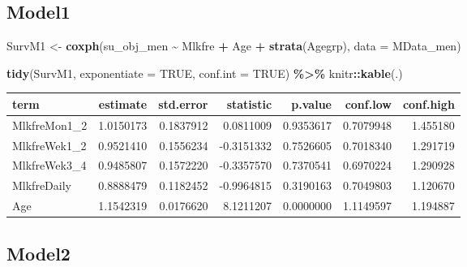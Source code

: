 \documentclass[
]{article}
\newenvironment{Shaded}{\begin{snugshade}}{\end{snugshade}}
\newcommand{\DataTypeTok}[1]{\textcolor[rgb]{0.13,0.29,0.53}{#1}}
\newcommand{\KeywordTok}[1]{\textcolor[rgb]{0.13,0.29,0.53}{\textbf{#1}}}
\newcommand{\NormalTok}[1]{#1}
\newcommand{\OperatorTok}[1]{\textcolor[rgb]{0.81,0.36,0.00}{\textbf{#1}}}
\newcommand{\OtherTok}[1]{\textcolor[rgb]{0.56,0.35,0.01}{#1}}
\newcommand{\StringTok}[1]{\textcolor[rgb]{0.31,0.60,0.02}{#1}}
\begin{document}
\hypertarget{model1-9}{%
\subsection{Model1}\label{model1-9}}

\begin{Shaded}
\begin{Highlighting}[]
\NormalTok{SurvM1 \textless{}{-}}\StringTok{  }\KeywordTok{coxph}\NormalTok{(su\_obj\_men }\OperatorTok{\textasciitilde{}}\StringTok{ }\NormalTok{Mlkfre }\OperatorTok{+}\StringTok{ }\NormalTok{Age }\OperatorTok{+}\StringTok{ }\KeywordTok{strata}\NormalTok{(Agegrp), }
                 \DataTypeTok{data =}\NormalTok{ MData\_men)}

\KeywordTok{tidy}\NormalTok{(SurvM1, }\DataTypeTok{exponentiate =} \OtherTok{TRUE}\NormalTok{, }\DataTypeTok{conf.int =} \OtherTok{TRUE}\NormalTok{) }\OperatorTok{\%\textgreater{}\%}\StringTok{ }
\StringTok{  }\NormalTok{knitr}\OperatorTok{::}\KeywordTok{kable}\NormalTok{(.)}
\end{Highlighting}
\end{Shaded}

\begin{longtable}[]{@{}lrrrrrr@{}}
\toprule
term & estimate & std.error & statistic & p.value & conf.low &
conf.high\tabularnewline
\midrule
\endhead
MlkfreMon1\_2 & 1.0150173 & 0.1837912 & 0.0811009 & 0.9353617 &
0.7079948 & 1.455180\tabularnewline
MlkfreWek1\_2 & 0.9521410 & 0.1556234 & -0.3151332 & 0.7526605 &
0.7018340 & 1.291719\tabularnewline
MlkfreWek3\_4 & 0.9485807 & 0.1572220 & -0.3357570 & 0.7370541 &
0.6970224 & 1.290928\tabularnewline
MlkfreDaily & 0.8888479 & 0.1182452 & -0.9964815 & 0.3190163 & 0.7049803
& 1.120670\tabularnewline
Age & 1.1542319 & 0.0176620 & 8.1211207 & 0.0000000 & 1.1149597 &
1.194887\tabularnewline
\bottomrule
\end{longtable}

\hypertarget{model2-9}{%
\subsection{Model2}\label{model2-9}}
\end{document}
